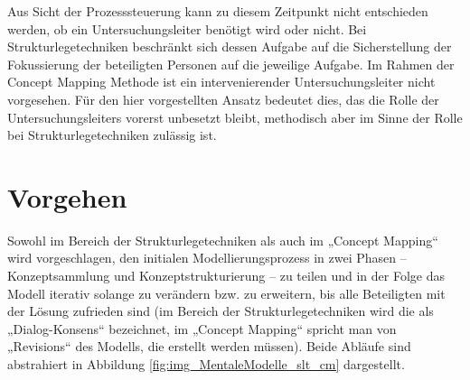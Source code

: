 Aus Sicht der Prozesssteuerung kann zu diesem Zeitpunkt nicht entschieden werden, ob ein Untersuchungsleiter benötigt wird oder nicht. Bei Strukturlegetechniken beschränkt sich dessen Aufgabe auf die Sicherstellung der Fokussierung der beteiligten Personen auf die jeweilige Aufgabe. Im Rahmen der Concept Mapping Methode ist ein intervenierender Untersuchungsleiter nicht vorgesehen. Für den hier vorgestellten Ansatz bedeutet dies, das die Rolle der Untersuchungsleiters vorerst unbesetzt bleibt, methodisch aber im Sinne der Rolle bei Strukturlegetechniken zulässig ist. 


\section{Vorgehen} %
\label{sub:vorgehen}

Sowohl im Bereich der Strukturlegetechniken als auch im „Concept Mapping“ wird vorgeschlagen, den initialen Modellierungsprozess in zwei Phasen -- Konzeptsammlung und Konzeptstrukturierung -- zu teilen und in der Folge das Modell iterativ solange zu verändern bzw. zu erweitern, bis alle Beteiligten mit der Lösung zufrieden sind (im Bereich der Strukturlegetechniken wird die als „Dialog-Konsens“ bezeichnet, im „Concept Mapping“ spricht man von „Revisions“ des Modells, die erstellt werden müssen). Beide Abläufe sind abstrahiert in Abbildung \ref{fig:img_MentaleModelle_slt_cm} dargestellt.

